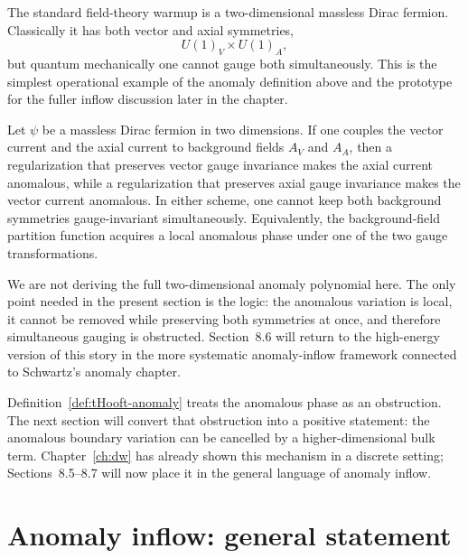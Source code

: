 The standard field-theory warmup is a two-dimensional massless Dirac fermion. Classically it has both vector and axial symmetries,
\begin{equation*}
U(1)_V\times U(1)_A,
\end{equation*}
but quantum mechanically one cannot gauge both simultaneously. This is the simplest operational example of the anomaly definition above and the prototype for the fuller inflow discussion later in the chapter.

\begin{example}\label{ex:2d-chiral-warmup}
Let $\psi$ be a massless Dirac fermion in two dimensions. If one couples the vector current and the axial current to background fields $A_V$ and $A_A$, then a regularization that preserves vector gauge invariance makes the axial current anomalous, while a regularization that preserves axial gauge invariance makes the vector current anomalous. In either scheme, one cannot keep both background symmetries gauge-invariant simultaneously. Equivalently, the background-field partition function acquires a local anomalous phase under one of the two gauge transformations.
\end{example}

\begin{remark}\label{rem:2d-warmup-scope}
We are not deriving the full two-dimensional anomaly polynomial here. The only point needed in the present section is the logic: the anomalous variation is local, it cannot be removed while preserving both symmetries at once, and therefore simultaneous gauging is obstructed. Section~8.6 will return to the high-energy version of this story in the more systematic anomaly-inflow framework connected to Schwartz's anomaly chapter.
\end{remark}

\begin{remark}\label{rem:anomaly-to-inflow}
Definition~\ref{def:tHooft-anomaly} treats the anomalous phase as an obstruction. The next section will convert that obstruction into a positive statement: the anomalous boundary variation can be cancelled by a higher-dimensional bulk term. Chapter~\ref{ch:dw} has already shown this mechanism in a discrete setting; Sections~8.5--8.7 will now place it in the general language of anomaly inflow.
\end{remark}

\section{Anomaly inflow: general statement}\label{sec:anomaly-inflow-general}

